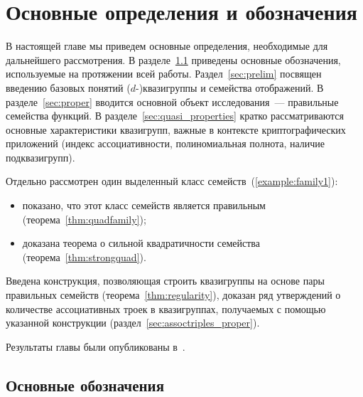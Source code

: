 \chapter{Основные определения и обозначения}\label{sec:intro}

    В настоящей главе мы приведем основные определения, необходимые для дальнейшего рассмотрения.
    В разделе~\ref{sec:notation} приведены основные обозначения, используемые на протяжении всей работы.
    Раздел~\ref{sec:prelim} посвящен введению базовых понятий ($d$-)квазигруппы и семейства отображений.
    В разделе~\ref{sec:proper} вводится основной объект исследования~--- правильные семейства функций.
    В разделе~\ref{sec:quasi_properties} кратко рассматриваются основные характеристики квазигрупп, важные в контексте криптографических приложений (индекс ассоциативности, полиномиальная полнота, наличие подквазигрупп).

    Отдельно рассмотрен один выделенный класс семейств~(\ref{example:family1}):
    \begin{itemize}
        \item показано, что этот класс семейств является правильным (теорема~\ref{thm:quadfamily});
        \item доказана теорема о сильной квадратичности семейства (теорема~\ref{thm:strongquad}).
    \end{itemize}

    Введена конструкция, позволяющая строить квазигруппы на основе пары правильных семейств (теорема~\ref{thm:regularity}), доказан ряд утверждений о количестве ассоциативных троек в квазигруппах, получаемых с помощью указанной конструкции (раздел~\ref{sec:assoctriples_proper}).

    Результаты главы были опубликованы в~\cite{dm21, galatenko23, galatenko2023proper, tsar24}.



\section{Основные обозначения}
\label{sec:notation}

